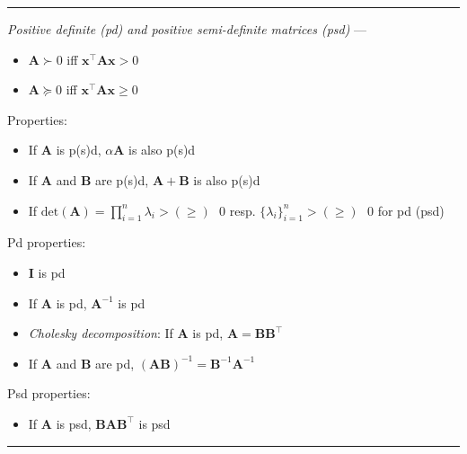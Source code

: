 {\color{lightgray}\hrule height 0.001mm}

\emph{Positive definite (pd) and positive semi-definite matrices (psd)} --- 
\begin{multicols}{2}
\begin{itemize}
    \item $\boldsymbol{A} \succ 0$ iff $\boldsymbol{x}^\intercal\boldsymbol{A}\boldsymbol{x} > 0$
    \item $\boldsymbol{A} \succeq 0$ iff $\boldsymbol{x}^\intercal\boldsymbol{A}\boldsymbol{x} \geq 0$
\end{itemize}
\end{multicols}
Properties:
\begin{itemize}
    \item If $\boldsymbol{A}$ is p(s)d, $\alpha\boldsymbol{A}$ is also p(s)d
    \item If $\boldsymbol{A}$ and $\boldsymbol{B}$ are p(s)d, $\boldsymbol{A} + \boldsymbol{B}$ is also p(s)d
    \item If $\textrm{det}(\boldsymbol{A}) = \prod_{i=1}^n \lambda_i > (\geq) \textrm{ } 0$ resp. $\{\lambda_i\}_{i=1}^n > (\geq) \textrm{ } 0$ for pd (psd)
\end{itemize}
Pd properties:
\begin{itemize}
    \item $\boldsymbol{I}$ is pd
    \item If $\boldsymbol{A}$ is pd, $\boldsymbol{A}^{-1}$ is pd
    \item \emph{Cholesky decomposition}: If $\boldsymbol{A}$ is pd, $\boldsymbol{A} = \boldsymbol{B}\boldsymbol{B}^\intercal$
    \item If $\boldsymbol{A}$ and $\boldsymbol{B}$ are pd, $(\boldsymbol{A}\boldsymbol{B})^{-1} = \boldsymbol{B}^{-1}\boldsymbol{A}^{-1}$
\end{itemize}
Psd properties:
\begin{itemize}
    \item If $\boldsymbol{A}$ is psd, $\boldsymbol{B}\boldsymbol{A}\boldsymbol{B}^\intercal$ is psd
\end{itemize}

{\color{black}\hrule height 0.001mm}

